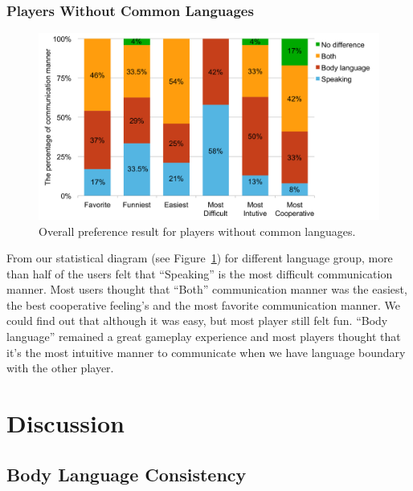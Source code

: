 \subsubsection{Players Without Common Languages}

\begin{figure}[!h]
\centering
\includegraphics[width=0.9\columnwidth]{Figures/US_FQ_Dif.pdf}
\caption{Overall preference result for players without common languages.}
\label{fig:US_FQ_Dif}
\end{figure}

From our statistical diagram (see Figure~\ref{fig:US_FQ_Dif}) for different language group, more than half of the users felt that ``Speaking'' is the most difficult communication manner.
Most users thought that ``Both'' communication manner was the easiest, the best cooperative feeling's and the most favorite communication manner. We could find out that although it was easy, but most player still felt fun. ``Body language'' remained a great gameplay experience and most players thought that it's the most intuitive manner to communicate when we have language boundary with the other player.


\section{Discussion}

\subsection{Body Language Consistency}

